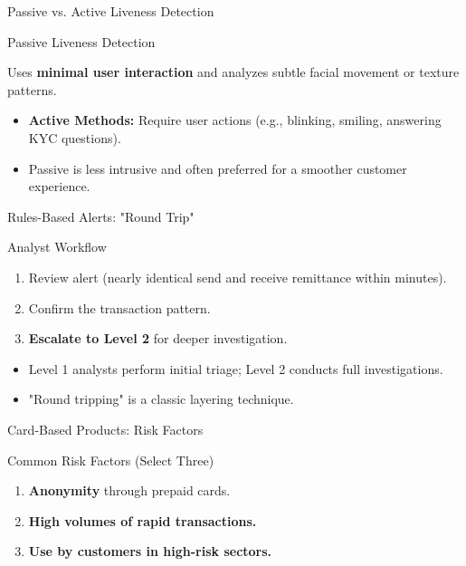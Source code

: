 \documentclass{beamer}
\begin{document}
	\begin{frame}{Passive vs. Active Liveness Detection}
		\begin{block}{Passive Liveness Detection}
			\begin{center}
				Uses \textbf{minimal user interaction} and analyzes subtle facial movement or texture patterns.
			\end{center}
		\end{block}
		\begin{itemize}
			\item \textbf{Active Methods:} Require user actions (e.g., blinking, smiling, answering KYC questions).
			\item Passive is less intrusive and often preferred for a smoother customer experience.
		\end{itemize}
	\end{frame}
	
	\begin{frame}{Rules-Based Alerts: "Round Trip"}
		\begin{block}{Analyst Workflow}
			\begin{enumerate}
				\item Review alert (nearly identical send and receive remittance within minutes).
				\item Confirm the transaction pattern.
				\item \textbf{Escalate to Level 2} for deeper investigation.
			\end{enumerate}
		\end{block}
		\begin{itemize}
			\item Level 1 analysts perform initial triage; Level 2 conducts full investigations.
			\item "Round tripping" is a classic layering technique.
		\end{itemize}
	\end{frame}
	
	\begin{frame}{Card-Based Products: Risk Factors}
		\begin{block}{Common Risk Factors (Select Three)}
			\begin{enumerate}
				\item \textbf{Anonymity} through prepaid cards.
				\item \textbf{High volumes of rapid transactions.}
				\item \textbf{Use by customers in high-risk sectors.}
			\end{enumerate}
		\end{block}
	\end{frame}
	
\end{document}
